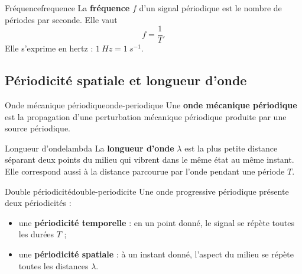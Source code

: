 \documentclass[11pt,a4paper]{article}
\begin{document}
\begin{definitionbox}{Fréquence}{frequence}
La \textbf{fréquence} $f$ d'un signal périodique est le nombre de périodes par seconde. Elle vaut
\[
\boxed{f=\frac{1}{T}}.
\]
Elle s'exprime en hertz : $\SI{1}{Hz}=\SI{1}{s^{-1}}$.
\end{definitionbox}

\begin{center}
\end{center}

\subsection{Périodicité spatiale et longueur d'onde}

\begin{definitionbox}{Onde mécanique périodique}{onde-periodique}
Une \textbf{onde mécanique périodique} est la propagation d'une perturbation mécanique périodique produite par une source périodique.
\end{definitionbox}

\begin{definitionbox}{Longueur d'onde}{lambda}
La \textbf{longueur d'onde} $\lambda$ est la plus petite distance séparant deux points du milieu qui vibrent dans le même état au même instant. Elle correspond aussi à la distance parcourue par l'onde pendant une période $T$.
\end{definitionbox}

\begin{retenirbox}{Double périodicité}{double-periodicite}
Une onde progressive périodique présente deux périodicités :
\begin{itemize}
  \item une \textbf{périodicité temporelle} : en un point donné, le signal se répète toutes les durées $T$ ;
  \item une \textbf{périodicité spatiale} : à un instant donné, l'aspect du milieu se répète toutes les distances $\lambda$.
\end{itemize}
\end{retenirbox}
\end{document}
